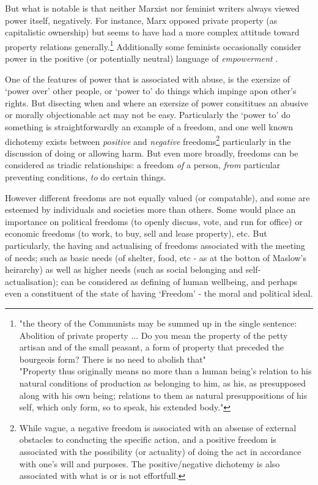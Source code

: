 But what is notable is that neither Marxist nor feminist writers always viewed power itself, negatively.
For instance, Marx opposed private property (as capitalistic ownership) but seems to have had a more complex attitude toward property relations generally.\footnote{"the theory of the Communists may be summed up in the single sentence: Abolition of private property ... Do you mean the property of the petty artisan and of the small peasant, a form of property that preceded the bourgeois form? There is no need to abolish that"\cite{MarxGutenberg}\\"Property thus originally means no more than a human being's relation to his natural conditions of production as belonging to him, as his, as presupposed along with his own being; relations to them as natural presuppositions of his self, which only form, so to speak, his extended body."\cite[Notebook V]{marx1993grundrisse}}
Additionally some feminists occasionally consider power in the positive (or potentially neutral) language of \textit{empowerment} \cite{doi:10.1111/j.1527-2001.1998.tb01350.x}.

One of the features of power that is associated with abuse, is the exersize of `power over' other people, or `power to' do things which impinge apon other's rights.\cite{doi:10.1111/j.1527-2001.1998.tb01350.x}
But disecting when and where an exersize of power consititues an abusive or morally objectionable act may not be easy.
Particularly the `power to' do something is straightforwardly an example of a freedom, and one well known dichotemy exists between \textit{positive} and \textit{negative} freedoms\footnote{While vague, a negative freedom is associated with an absense of external obstacles to conducting the specific action, and a positive freedom is associated with the possibility (or actuality) of doing the act in accordance with one's will and purposes. The positive/negative dichotemy is also associated with what is or is not effortfull.\cite{Mossel2009-MOSNA}} particularly in the discussion of doing or allowing harm.
But even more broadly, freedoms can be considered as triadic relationships: a freedom \textit{of} a person, \textit{from} particular preventing conditions, \textit{to} do certain things.\cite{Negative_and_Positive_Freedom}

However different freedoms are not equally valued (or compatable), and some are esteemed by individuals and societies more than others.
Some would place an importance on political freedoms (to openly discuss, vote, and run for office) or economic freedoms (to work, to buy, sell and lease property), etc. %
But particularly, the having and actualising of freedoms associated with the meeting of needs; such as basic needs (of shelter, food, etc - as at the botton of Maslow's heirarchy) as well as higher needs (such as social belonging and self-actualisation); can be considered as defining of human wellbeing, and perhaps even a constituent of the state of having `Freedom' - the moral and political ideal.

